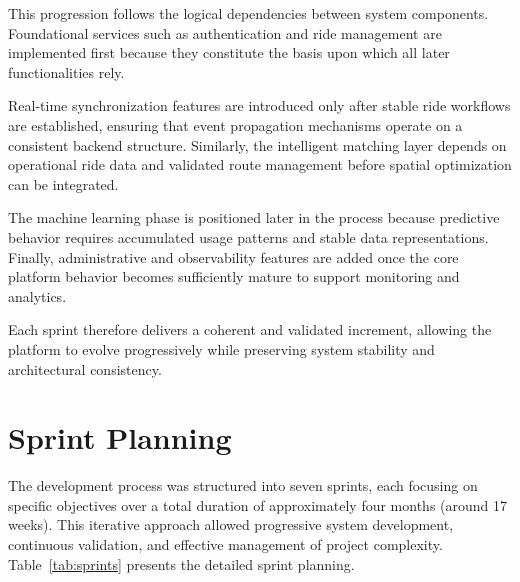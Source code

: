 This progression follows the logical dependencies between system components. Foundational services such as authentication and ride management are implemented first because they constitute the basis upon which all later functionalities rely.

Real-time synchronization features are introduced only after stable ride workflows are established, ensuring that event propagation mechanisms operate on a consistent backend structure. Similarly, the intelligent matching layer depends on operational ride data and validated route management before spatial optimization can be integrated.

The machine learning phase is positioned later in the process because predictive behavior requires accumulated usage patterns and stable data representations. Finally, administrative and observability features are added once the core platform behavior becomes sufficiently mature to support monitoring and analytics.

Each sprint therefore delivers a coherent and validated increment, allowing the platform to evolve progressively while preserving system stability and architectural consistency.

\section{Sprint Planning}

The development process was structured into seven sprints, each focusing on specific objectives over a total duration of approximately four months (around 17 weeks). This iterative approach allowed progressive system development, continuous validation, and effective management of project complexity. Table~\ref{tab:sprints} presents the detailed sprint planning.

